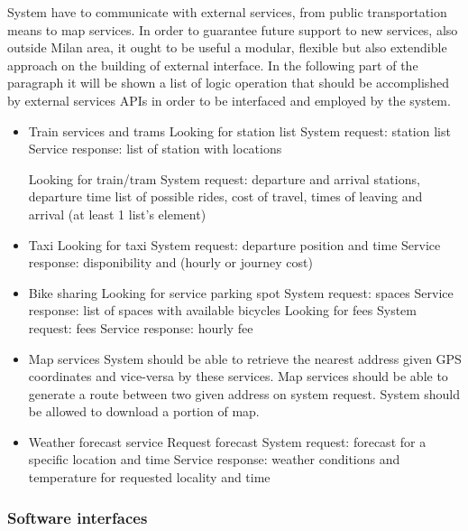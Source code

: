 System have to communicate with external services, from public transportation means to map services. In order to guarantee future support to new services, also outside Milan area, it ought to be useful a modular, flexible but also extendible approach on the building of external interface. In the following part of the paragraph it will be shown a list of logic operation that should be accomplished by external services APIs in order to be interfaced and employed by the system.

\begin{itemize}
	\item Train services and trams
	\subitem Looking for station list
	\subsubitem System request: station list
	\subsubitem Service response: list of station with locations
	
	\subitem Looking for train/tram
	\subsubitem System request: departure and arrival stations, departure time
	\subsubitem list of possible rides, cost of travel, times of leaving and arrival (at least 1 list's element)
	
	\item Taxi
	\subitem Looking for taxi
	\subsubitem System request: departure position and time
	\subsubitem Service response: disponibility and (hourly or journey cost)
	
	\item Bike sharing
	\subitem Looking for service parking spot
	\subsubitem System request: spaces
	\subsubitem Service response: list of spaces with available bicycles
	\subitem Looking for fees
	\subsubitem System request: fees
	\subsubitem Service response: hourly fee
	
	\item Map services
	\subitem System should be able to retrieve the nearest address given GPS coordinates and vice-versa by these services.
	\subitem Map services should be able to generate a route between two given address on system request.
	\subitem System should be allowed to download a portion of map.
	
	\item Weather forecast service
	\subitem Request forecast
	\subsubitem System request: forecast for a specific location and time
	\subsubitem Service response: weather conditions and temperature for requested locality and time
	
	
\end{itemize}

\subsubsection{Software interfaces}

